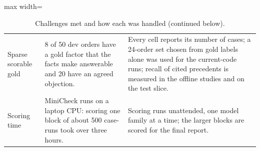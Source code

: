 \begin{table}[!t]
\begin{adjustbox}{max width=\textwidth}
\begin{tabular}{@{}p{4.6cm}p{5.4cm}p{5.2cm}@{}}
Sparse scorable gold & 8 of 50 dev orders have a gold factor that the facts make answerable and 20 have an agreed objection. & Every cell reports its number of cases; a 24-order set chosen from gold labels alone was used for the current-code runs; recall of cited precedents is measured in the offline studies and on the test slice. \\
Scoring time & MiniCheck runs on a laptop CPU: scoring one block of about 500 case-runs took over three hours. & Scoring runs unattended, one model family at a time; the larger blocks are scored for the final report. \\
\bottomrule
\end{tabular}
\end{adjustbox}
\caption{Challenges met and how each was handled (continued below).}
\label{tab:challenges}
\end{table}

